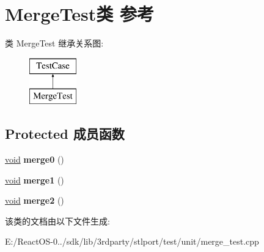 \hypertarget{class_merge_test}{}\section{Merge\+Test类 参考}
\label{class_merge_test}
类 Merge\+Test 继承关系图\+:\begin{figure}[H]
\begin{center}
\leavevmode
\includegraphics[height=2.000000cm]{class_merge_test}
\end{center}
\end{figure}
\subsection*{Protected 成员函数}
\begin{DoxyCompactItemize}
\item 
\mbox{\label{class_merge_test_a6e3a2cdcf56675b00c3e826e6d634a45}} 
\hyperlink{interfacevoid}{void} {\bfseries merge0} ()
\item 
\mbox{\label{class_merge_test_a8af8a84644218a388275c1de4d9e1247}} 
\hyperlink{interfacevoid}{void} {\bfseries merge1} ()
\item 
\mbox{\label{class_merge_test_aa577624c411421cae92238e347475956}} 
\hyperlink{interfacevoid}{void} {\bfseries merge2} ()
\end{DoxyCompactItemize}


该类的文档由以下文件生成\+:\begin{DoxyCompactItemize}
\item 
E\+:/\+React\+O\+S-\/0../sdk/lib/3rdparty/stlport/test/unit/merge\+\_\+test.\+cpp\end{DoxyCompactItemize}
